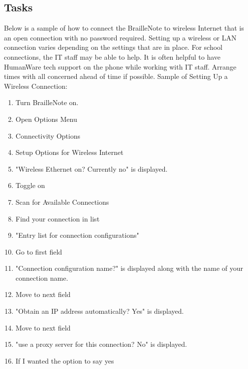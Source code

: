 \documentclass[10pt,letterpaper,twoside]{report}
\begin{document}
{\subsection{Tasks}
Below is a sample of how to connect the BrailleNote to wireless Internet that is an open connection with no password required. Setting up a wireless or LAN connection varies depending on the settings that are in place. For school connections, the IT staff may be able to help. It is often helpful to have HumanWare tech support on the phone while working with IT staff. Arrange times with all concerned ahead of time if possible. 
Sample of Setting Up a Wireless Connection:
\begin{enumerate}
	\item Turn BrailleNote on.
	\item Open Options Menu 
	\item Connectivity Options 
	\item Setup Options for Wireless Internet 
	\item "Wireless Ethernet on? Currently no" is displayed.
	\item Toggle on 
	\item Scan for Available Connections 
	\item Find your connection in list 
	\item "Entry list for connection configurations"
	\item Go to first field 
	\item "Connection configuration name?" is displayed along with the name of your connection name.
	\item Move to next field 
	\item "Obtain an IP address automatically? Yes" is displayed.
	\item Move to next field 
	\item "use a proxy server for this connection? No" is displayed.
	\item If I wanted the option to say yes 

\end{enumerate}}
\end{document}
